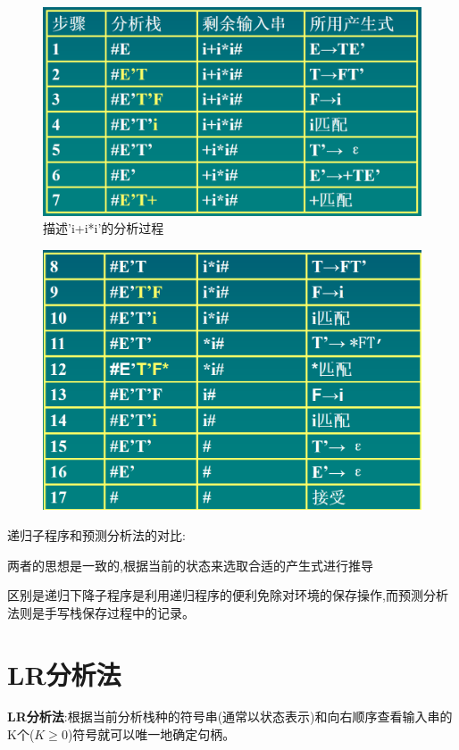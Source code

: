 \documentclass[UTF8,a4paper]{ctexart}
\begin{document}
 \begin{figure}[H]
   \centering
   \includegraphics[scale = 0.3]{assets/CompilerConstructionPrinciples_0adb6.png}
   \caption{描述'i+i*i'的分析过程}
 \end{figure}
 \begin{figure}[H]
   \centering
   \includegraphics[scale = 0.3]{assets/CompilerConstructionPrinciples_1fd6a.png}
 \end{figure}

 递归子程序和预测分析法的对比:

 两者的思想是一致的,根据当前的状态来选取合适的产生式进行推导

 区别是递归下降子程序是利用递归程序的便利免除对环境的保存操作,而预测分析法则是手写栈保存过程中的记录。

 \section{LR分析法}
 \textbf{LR分析法}:根据当前分析栈种的符号串(通常以状态表示)和向右顺序查看输入串的K个($K\geq 0$)符号就可以唯一地确定句柄。
\end{document}

